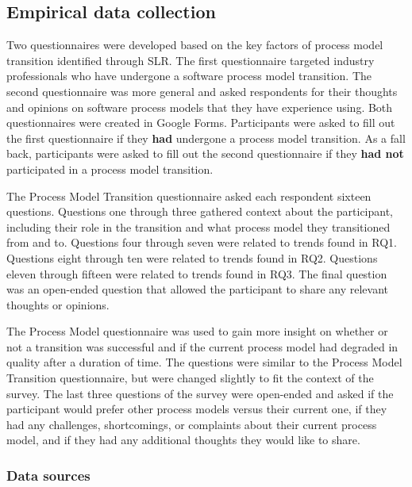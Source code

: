 \documentclass[conference]{IEEEtran}
\begin{document}




\subsection{Empirical data collection}
Two questionnaires were developed based on the key factors of process model transition identified through SLR. The first questionnaire targeted industry professionals who have undergone a software process model transition. The second questionnaire was more general and asked respondents for their thoughts and opinions on software process models that they have experience using. Both questionnaires were created in Google Forms. Participants were asked to fill out the first questionnaire if they \textbf{had} undergone a process model transition.  As a fall back, participants were asked to fill out the second questionnaire if they \textbf{had not} participated in a process model transition.

The Process Model Transition questionnaire asked each respondent sixteen questions. Questions one through three gathered context about the participant, including their role in the transition and what process model they transitioned from and to. Questions four through seven were related to trends found in RQ1. Questions eight through ten were related to trends found in RQ2. Questions eleven through fifteen were related to trends found in RQ3. The final question was an open-ended question that allowed the participant to share any relevant thoughts or opinions.

The Process Model questionnaire was used to gain more insight on whether or not a transition was successful and if the current process model had degraded in quality after a duration of time. The questions were similar to the Process Model Transition questionnaire, but were changed slightly to fit the context of the survey. The last three questions of the survey were open-ended and asked if the participant would prefer other process models versus their current one, if they had any challenges, shortcomings, or complaints about their current process model, and if they had any additional thoughts they would like to share.

\subsubsection{Data sources}
\end{document}
